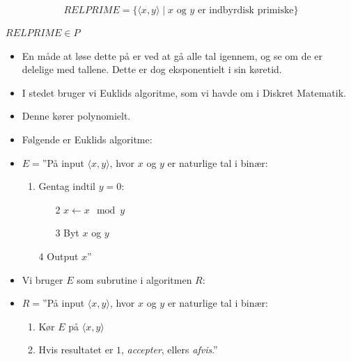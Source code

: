 \begin{frame}[allowframebreaks]
	\begin{equation}
		RELPRIME = \{\langle x, y \rangle \mid x \text{ og } y \text{ er indbyrdisk primiske}\}
	\end{equation}

	\begin{theorem}
		$RELPRIME \in P$
	\end{theorem}

	\begin{itemize}
		\item En måde at løse dette på er ved at gå alle tal igennem, og se om de er delelige med tallene. Dette er dog eksponentielt i sin køretid.
		\item I stedet bruger vi Euklids algoritme, som vi havde om i Diskret Matematik.
		\item Denne kører polynomielt.
		\item Følgende er Euklids algoritme:
		\item $E = $''På input \(\langle x,y\rangle\), hvor $x$ og $y$ er naturlige tal i binær:
		      \begin{enumerate}
			      \item Gentag indtil $y = 0$:
			            \begin{enumerate}
				            \item[2] $x \leftarrow x \mod y$
				            \item[3] Byt $x$ og $y$
			            \end{enumerate}
			      \item[4] Output $x$''
		      \end{enumerate}
		\item Vi bruger $E$  som subrutine i algoritmen $R$:
		\item $R = $''På input \(\langle x, y \rangle\), hvor $x$ og $y$ er naturlige tal i binær:
		      \begin{enumerate}
			      \item Kør $E$ på \(\langle x, y \rangle \)
			      \item Hvis resultatet er $1$, \textit{accepter}, ellers \textit{afvis}.''
		      \end{enumerate}


\end{itemize}
\end{frame}
